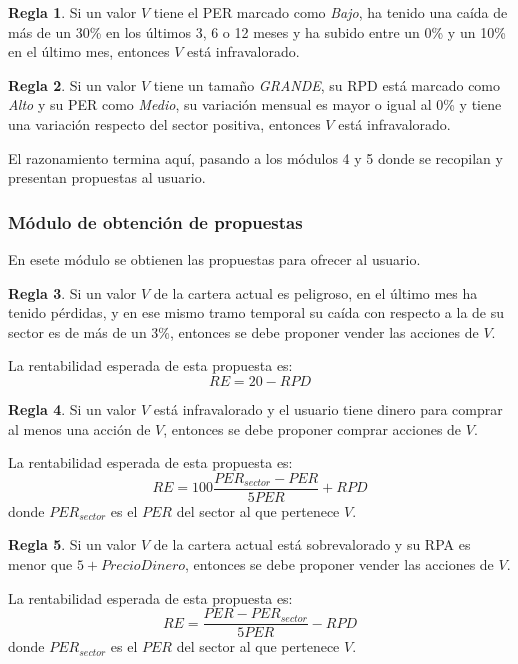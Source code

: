 \documentclass[a4paper, 11pt, titlepage]{article}
\theoremstyle{definition}
\newtheorem{regla}{Regla}
\begin{document}
  \begin{regla}
      Si un valor $V$ tiene el PER marcado como \emph{Bajo}, ha tenido una caída de más de un 30\% en los últimos 3, 6 o 12 meses y ha subido entre un 0\% y un 10\% en el último mes, entonces $V$ está infravalorado.
  \end{regla}

  \begin{regla}
      Si un valor $V$ tiene un tamaño \emph{GRANDE}, su RPD está marcado como \emph{Alto} y su PER como \emph{Medio}, su variación mensual es mayor o igual al 0\% y tiene una variación respecto del sector positiva, entonces $V$ está infravalorado.
  \end{regla}

  El razonamiento termina aquí, pasando a los módulos 4 y 5 donde se recopilan
  y presentan propuestas al usuario.

  \subsubsection{Módulo de obtención de propuestas}

  En esete módulo se obtienen las propuestas para ofrecer al usuario.

  \begin{regla}
        Si un valor $V$ de la cartera actual es peligroso, en el último mes ha tenido pérdidas, y en ese mismo tramo temporal su caída con respecto a la de su sector es de más de un 3\%, entonces se debe proponer vender las acciones de $V$.

        La rentabilidad esperada de esta propuesta es:
        \[
        RE = 20 - RPD
        \]
    \end{regla}

    \begin{regla}
        Si un valor $V$ está infravalorado y el usuario tiene dinero para comprar al menos una acción de $V$, entonces se debe proponer comprar acciones de $V$.

        La rentabilidad esperada de esta propuesta es:
        \[
        RE = 100 \frac{PER_{sector} - PER}{5 PER} + RPD
        \]
        donde $PER_{sector}$ es el $PER$ del sector al que pertenece $V$.
    \end{regla}

    \begin{regla}
        Si un valor $V$ de la cartera actual está sobrevalorado y su RPA es menor que $5 + PrecioDinero$, entonces se debe proponer vender las acciones de $V$.

        La rentabilidad esperada de esta propuesta es:
        \[
        RE = \frac{PER - PER_{sector}}{5 PER} - RPD
        \]
        donde $PER_{sector}$ es el $PER$ del sector al que pertenece $V$.
    \end{regla}
\end{document}
